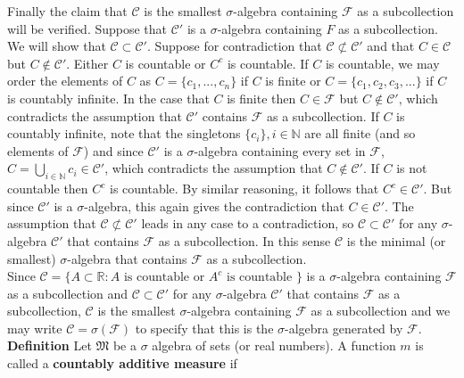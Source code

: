 \documentclass[a4paper]{article}
\begin{document}
Finally the claim that $\mathcal{C}$ is the smallest $\sigma$-algebra containing $\mathcal{F}$ as a subcollection will be verified. Suppose that $\mathcal{C}'$ is a $\sigma$-algebra containing $F$ as a subcollection. We will show that $\mathcal{C}\subset \mathcal{C}'$. Suppose for contradiction that $\mathcal{C} \not\subset \mathcal{C}'$ and that $C \in \mathcal{C}$ but $C \not\in \mathcal{C}'$. Either $C$ is countable or $C^c$ is countable. If $C$ is countable, we may order the elements of $C$ as $C = \{c_1,...,c_n\}$ if $C$ is finite or $C = \{c_1,c_2,c_3,...\}$ if $C$ is countably infinite. In the case that $C$ is finite then $C \in \mathcal{F}$ but $C \not\in \mathcal{C}'$, which contradicts the assumption that $\mathcal{C}'$ contains $\mathcal{F}$ as a subcollection. If $C$ is countably infinite, note that the singletons $\{c_i\}, i \in \mathbb{N}$ are all finite (and so elements of $\mathcal{F}$) and since $\mathcal{C}'$ is a $\sigma$-algebra containing every set in $\mathcal{F}$, $C = \bigcup_{i\in \mathbb{N}} c_i \in \mathcal{C}'$, which contradicts the assumption that $C \not\in \mathcal{C}'$. If $C$ is not countable then $C^c$ is countable. By similar reasoning, it follows that $C^c \in \mathcal{C}'$. But since $\mathcal{C}'$ is a $\sigma$-algebra, this again gives the contradiction that $C \in \mathcal{C}'$. The assumption that $\mathcal{C} \not\subset \mathcal{C}'$ leads in any case to a contradiction, so $\mathcal{C} \subset \mathcal{C}'$ for any $\sigma$-algebra $\mathcal{C}'$ that contains $\mathcal{F}$ as a subcollection. In this sense $\mathcal{C}$ is the minimal (or smallest) $\sigma$-algebra that contains $\mathcal{F}$ as a subcollection.\\

Since $\mathcal{C} =\{A \subset \mathbb{R} : A \text{ is countable or } A^c \text{ is countable }\}$ is a $\sigma$-algebra containing $\mathcal{F}$ as a subcollection and $\mathcal{C} \subset \mathcal{C}'$ for any $\sigma$-algebra $\mathcal{C}'$ that contains $\mathcal{F}$ as a subcollection, $\mathcal{C}$ is the smallest $\sigma$-algebra containing $\mathcal{F}$ as a subcollection and we may write $\mathcal{C} = \sigma(\mathcal{F})$ to specify that this is the $\sigma$-algebra generated by $\mathcal{F}$. \\



{\bf Definition} Let $\mathfrak{M}$ be a $\sigma$ algebra  of sets (or real numbers). A function $m$ is called a {\bf countably additive measure} if\\
\end{document}
